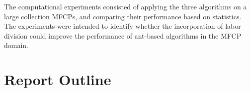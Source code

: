 The computational experiments consisted of applying the three algorithms on a large collection MFCPs, and comparing their performance based on statistics. The experiments were intended to identify whether the incorporation of labor division could improve the performance of ant-based algorithms in the MFCP domain.


\section{Report Outline}
\begin{comment}
This report is structured accordingly:
\begin{itemize}
   \item[]\textbf{Chapter 1} offers an introduction to the problem and presents the motivation and research questions.
   \item[]\textbf{Chapter 2} formally define the mathematical MFMC problem.
   \item[]\textbf{Chapter 3} discusses the connection between swarm intelligence and ants, describes historically important ant colony optimization algorithms.
   \item[]\textbf{Chapter 4} presents a literature review on trends in ant colony optimization.
   \item[]\textbf{Chapter 5} introduces a modified ant-based algorithm.
   \item[]\textbf{Chapter 6} provides details on how the problem representation and how the ants construct a feasible solution. In addition, the chapter presents a detailed review of the novel ACO algorithm proposed to answer the research questions and specifies the experimental scheme.
   \item[]\textbf{Chapter 7} presents the results of computational evaluation of the ACO algorithms
   \item[]\textbf{Chapter 8} discusses the performance of the modified ACO algorithm.
   \item[]\textbf{Chapter 9} summarizes the findings.
\end{itemize}
\end{comment}
